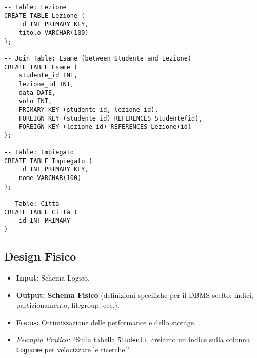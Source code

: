 \begin{itemize}
\begin{verbatim}
-- Table: Lezione
CREATE TABLE Lezione (
	id INT PRIMARY KEY,
	titolo VARCHAR(100)
);

-- Join Table: Esame (between Studente and Lezione)
CREATE TABLE Esame (
	studente_id INT,
	lezione_id INT,
	data DATE,
	voto INT,
	PRIMARY KEY (studente_id, lezione_id),
	FOREIGN KEY (studente_id) REFERENCES Studente(id),
	FOREIGN KEY (lezione_id) REFERENCES Lezione(id)
);

-- Table: Impiegato
CREATE TABLE Impiegato (
	id INT PRIMARY KEY,
	nome VARCHAR(100)
);

-- Table: Città
CREATE TABLE Città (
	id INT PRIMARY
)
		\end{verbatim}
	\end{itemize}
	
	\subsection{Design Fisico}
	\begin{itemize}
		\item \textbf{Input:} Schema Logico.
		\item \textbf{Output:} \textbf{Schema Fisico} (definizioni specifiche per il DBMS scelto: indici, partizionamento, filegroup, ecc.).
		\item \textbf{Focus:} Ottimizzazione delle performance e dello storage.
		\item \textit{Esempio Pratico:} ``Sulla tabella \texttt{Studenti}, creiamo un indice sulla colonna \texttt{Cognome} per velocizzare le ricerche.''
	\end{itemize}
	
